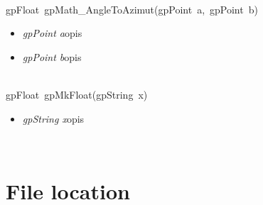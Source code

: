  \ \\
\mbox{\textsf{gpFloat gpMath_AngleToAzimut(gpPoint a, gpPoint b)}}
	\begin{itemize}
		\item \textit{gpPoint a}\quad opis
		\item \textit{gpPoint b}\quad opis
	\end{itemize}

 \ \\
\mbox{\textsf{gpFloat gpMkFloat(gpString x)}}
	\begin{itemize}
		\item \textit{gpString x}\quad opis
	\end{itemize}

 \ \\

\section{File location}

